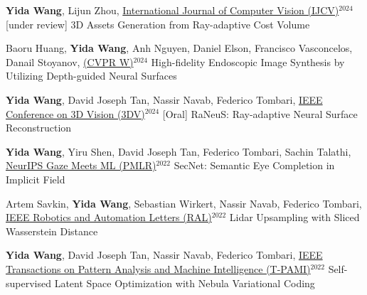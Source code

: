 


\begin{cventries}
\begin{enumerate}[label={[\arabic*]}, leftmargin=*]

\item 
\cvpublication
{\textbf{Yida Wang}, Lijun Zhou, \underline{International Journal of Computer Vision (IJCV)}$^{2024}$ [under review]} %
{3D Assets Generation from Ray-adaptive Cost Volume} %
{} %
{} %

\item 
\cvpublication
{Baoru Huang, \textbf{Yida Wang}, Anh Nguyen, Daniel Elson, Francisco Vasconcelos, Danail Stoyanov, \underline{(CVPR W)}$^{2024}$} %
{High-fidelity Endoscopic Image Synthesis by Utilizing Depth-guided Neural Surfaces} %
{} %
{} %

\item 
\cvpublication
{\textbf{Yida Wang}, David Joseph Tan, Nassir Navab, Federico Tombari, \underline{IEEE Conference on 3D Vision (3DV)}$^{2024}$ [Oral]} %
{RaNeuS: Ray-adaptive Neural Surface Reconstruction} %
{} %
{} %

\item 
\cvpublication
{\textbf{Yida Wang}, Yiru Shen, David Joseph Tan, Federico Tombari, Sachin Talathi, \underline{NeurIPS Gaze Meets ML (PMLR)}$^{2022}$} %
{SecNet: Semantic Eye Completion in Implicit Field} %
{} %
{} %

\item 
\cvpublication
{Artem Savkin, \textbf{Yida Wang}, Sebastian Wirkert, Nassir Navab, Federico Tombari, \underline{IEEE Robotics and Automation Letters (RAL)}$^{2022}$} %
{Lidar Upsampling with Sliced Wasserstein Distance} %
{} %
{} %

\item 
\cvpublication
{\textbf{Yida Wang}, David Joseph Tan, Nassir Navab, Federico Tombari, \underline{IEEE Transactions on Pattern Analysis and Machine Intelligence (T-PAMI)}$^{2022}$} %
{Self-supervised Latent Space Optimization with Nebula Variational Coding} %
{} %
{} %


\end{enumerate}
\end{cventries}
